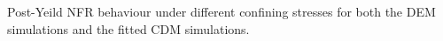 \label{fig:fitted1} Post-Yeild NFR behaviour under different confining stresses for both the DEM simulations and the fitted CDM simulations.